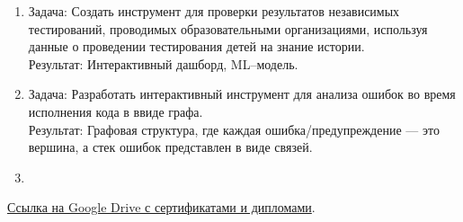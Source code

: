 \documentclass[11pt]{article}
\begin{document}
    \begin{enumerate}
        \setlength{\itemsep}{5pt}
        \setlength{\parsep}{0pt}
        \setlength{\topsep}{0pt}

        \item {}
        Задача: Создать инструмент для проверки результатов независимых тестирований,
        проводимых образовательными организациями, используя данные о проведении тестирования
        детей на знание истории.\\
        Результат: Интерактивный дашборд, ML--модель.

        \item {}
        Задача: Разработать интерактивный инструмент для анализа ошибок во время исполнения кода
        в ввиде графа.\\
        Результат: Графовая структура, где каждая ошибка/предупреждение --- это вершина, а стек ошибок
        представлен в виде связей.

        \item {}
    \end{enumerate}
    \vspace{-8pt}


    \href{https://drive.google.com/drive/folders/1PbiaM1iDKKHpeF0jfbwqTMyxY1bCCpZh?usp=sharing}{Ссылка на Google Drive с сертификатами и дипломами}.

\end{document}
